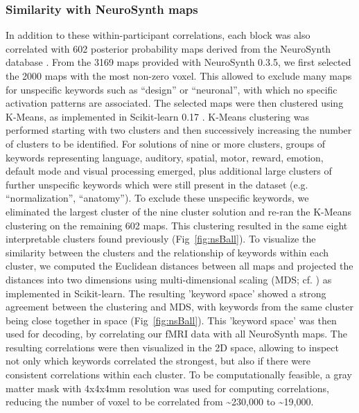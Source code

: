 \documentclass[fleqn,10pt]{SelfArx} %
\begin{document}
\subsubsection*{Similarity with NeuroSynth maps}
In addition to these within-participant correlations, each block was also correlated with 602 posterior probability maps derived from the NeuroSynth database \citep{Yarkoni_2011}. From the 3169 maps provided with NeuroSynth 0.3.5, we first selected the 2000 maps with the most non-zero voxel. This allowed to exclude many maps for unspecific keywords such as “design” or “neuronal”, with which no specific activation patterns are associated. The selected maps were then clustered using K-Means, as implemented in Scikit-learn 0.17 \citep{Pedregosa_2011}. K-Means clustering was performed starting with two clusters and then successively increasing the number of clusters to be identified. For solutions of nine or more clusters, groups of keywords representing language, auditory, spatial, motor, reward, emotion, default mode and visual processing emerged, plus additional large clusters of further unspecific keywords which were still present in the dataset (e.g. “normalization”, “anatomy”). To exclude these unspecific keywords, we eliminated the largest cluster of the nine cluster solution and re-ran the K-Means clustering on the remaining 602 maps. This clustering resulted in the same eight interpretable clusters found previously (Fig~\ref{fig:nsBall}). To visualize the similarity between the clusters and the relationship of keywords within each cluster, we computed the Euclidean distances between all maps and projected the distances into two dimensions using multi-dimensional scaling (MDS; cf. \citet{Kriegeskorte_2008}) as implemented in Scikit-learn. The resulting 'keyword space' showed a strong agreement between the clustering and MDS, with keywords from the same cluster being close together in space (Fig~\ref{fig:nsBall}).
This 'keyword space' was then used for decoding, by correlating our fMRI data with all NeuroSynth maps. The resulting correlations were then visualized in the 2D space, allowing to inspect not only which keywords correlated the strongest, but also if there were consistent correlations within each cluster. To be computationally feasible, a gray matter mask with 4x4x4mm resolution was used for computing correlations, reducing the number of voxel to be correlated from \textasciitilde230,000 to \textasciitilde19,000.
\end{document}
